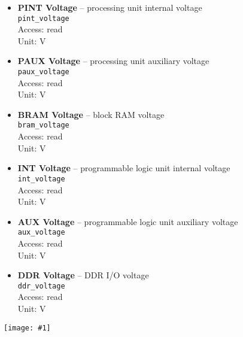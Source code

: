 \documentclass[12pt,a4paper]{article}
\newcommand{\screenshot}[1]{\begin{minipage}[c]{\textwidth}\texttt{[image: \#1]}\end{minipage}}
\begin{document}
	\begin{itemize}
		\item \textbf{PINT Voltage} -- processing unit internal voltage\\
			  \texttt{pint\_voltage}\\
			  Access: read\\
			  Unit: V
		\item \textbf{PAUX Voltage} -- processing unit auxiliary voltage\\
			  \texttt{paux\_voltage}\\
			  Access: read\\
			  Unit: V
		\item \textbf{BRAM Voltage} -- block RAM voltage\\
			  \texttt{bram\_voltage}\\
			  Access: read\\
			  Unit: V
		\item \textbf{INT Voltage} -- programmable logic unit internal voltage\\
			  \texttt{int\_voltage}\\
			  Access: read\\
			  Unit: V
		\item \textbf{AUX Voltage} -- programmable logic unit auxiliary voltage\\
			  \texttt{aux\_voltage}\\
			  Access: read\\
			  Unit: V
		\item \textbf{DDR Voltage} -- DDR I/O voltage\\
			  \texttt{ddr\_voltage}\\
			  Access: read\\
			  Unit: V
	\end{itemize}
	\screenshot{screenshots/expert.png}
\end{document}

